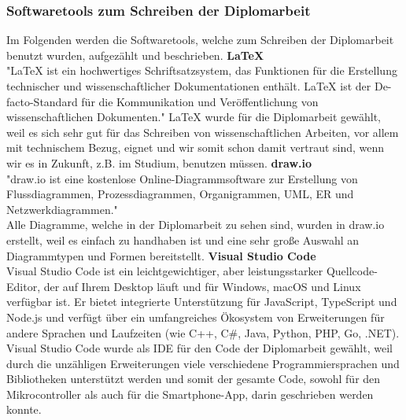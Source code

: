 \documentclass[11pt, twoside]{article}
\begin{document}
\subsubsection{Softwaretools zum Schreiben der Diplomarbeit}
Im Folgenden werden die Softwaretools, welche zum Schreiben der Diplomarbeit benutzt wurden, aufgezählt und beschrieben.
\newpage
\noindent \textbf{\LaTeX} \\
"LaTeX ist ein hochwertiges Schriftsatzsystem, das Funktionen für die Erstellung technischer und wissenschaftlicher Dokumentationen enthält. LaTeX ist der De-facto-Standard für die Kommunikation und Veröffentlichung von wissenschaftlichen Dokumenten." \parencite{noauthor_urlpi29_nodate} \newline
LaTeX wurde für die Diplomarbeit gewählt, weil es sich sehr gut für das Schreiben von wissenschaftlichen Arbeiten, vor allem mit technischem Bezug, eignet und wir somit schon damit vertraut sind, wenn wir es in Zukunft, z.B. im Studium, benutzen müssen.
\vspace{4mm}\newline
\textbf{draw.io} \\
"draw.io ist eine kostenlose Online-Diagrammsoftware zur Erstellung von Flussdiagrammen, Prozessdiagrammen, Organigrammen, UML, ER und Netzwerkdiagrammen." \parencite{noauthor_urlpi30_nodate} \\
Alle Diagramme, welche in der Diplomarbeit zu sehen sind, wurden in draw.io erstellt, weil es einfach zu handhaben ist und eine sehr große Auswahl an Diagrammtypen und Formen bereitstellt.
\vspace{4mm}\newline
\textbf{Visual Studio Code} \\
\glqq Visual Studio Code ist ein leichtgewichtiger, aber leistungsstarker Quellcode-Editor, der auf Ihrem Desktop läuft und für Windows, macOS und Linux verfügbar ist. Er bietet integrierte Unterstützung für JavaScript, TypeScript und Node.js und verfügt über ein umfangreiches Ökosystem von Erweiterungen für andere Sprachen und Laufzeiten (wie C++, C\#, Java, Python, PHP, Go, .NET).\grqq{} \parencite{noauthor_urlpi31_nodate} \\
Visual Studio Code wurde als IDE für den Code der Diplomarbeit gewählt, weil durch die unzähligen Erweiterungen viele verschiedene Programmiersprachen und Bibliotheken unterstützt werden und somit der gesamte Code, sowohl für den Mikrocontroller als auch für die Smartphone-App, darin geschrieben werden konnte.
\vspace{4mm}\newline
\end{document}
